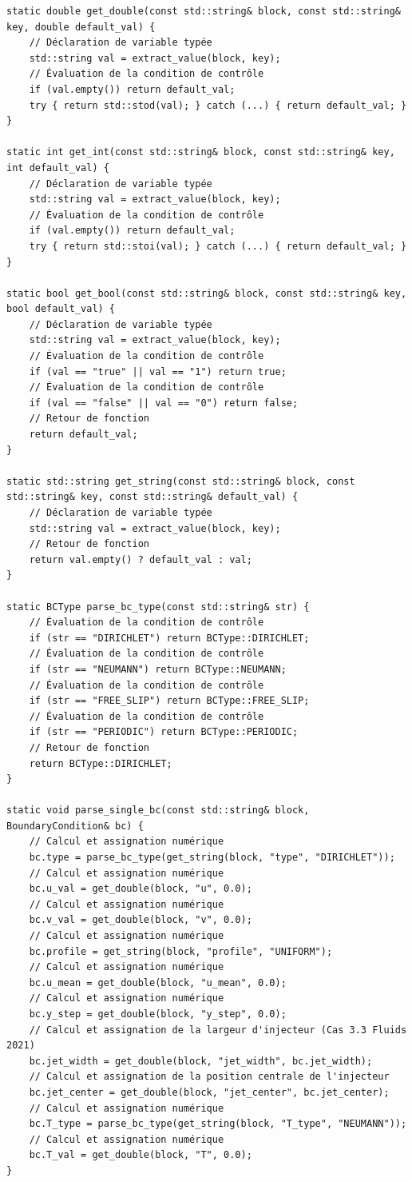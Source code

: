 \documentclass[10pt,a4paper,oneside]{book}
\begin{document}
\begin{lstlisting}[language={[11]C++}]
static double get_double(const std::string& block, const std::string& key, double default_val) {
    // Déclaration de variable typée
    std::string val = extract_value(block, key);
    // Évaluation de la condition de contrôle
    if (val.empty()) return default_val;
    try { return std::stod(val); } catch (...) { return default_val; }
}

static int get_int(const std::string& block, const std::string& key, int default_val) {
    // Déclaration de variable typée
    std::string val = extract_value(block, key);
    // Évaluation de la condition de contrôle
    if (val.empty()) return default_val;
    try { return std::stoi(val); } catch (...) { return default_val; }
}

static bool get_bool(const std::string& block, const std::string& key, bool default_val) {
    // Déclaration de variable typée
    std::string val = extract_value(block, key);
    // Évaluation de la condition de contrôle
    if (val == "true" || val == "1") return true;
    // Évaluation de la condition de contrôle
    if (val == "false" || val == "0") return false;
    // Retour de fonction
    return default_val;
}

static std::string get_string(const std::string& block, const std::string& key, const std::string& default_val) {
    // Déclaration de variable typée
    std::string val = extract_value(block, key);
    // Retour de fonction
    return val.empty() ? default_val : val;
}

static BCType parse_bc_type(const std::string& str) {
    // Évaluation de la condition de contrôle
    if (str == "DIRICHLET") return BCType::DIRICHLET;
    // Évaluation de la condition de contrôle
    if (str == "NEUMANN") return BCType::NEUMANN;
    // Évaluation de la condition de contrôle
    if (str == "FREE_SLIP") return BCType::FREE_SLIP;
    // Évaluation de la condition de contrôle
    if (str == "PERIODIC") return BCType::PERIODIC;
    // Retour de fonction
    return BCType::DIRICHLET;
}

static void parse_single_bc(const std::string& block, BoundaryCondition& bc) {
    // Calcul et assignation numérique
    bc.type = parse_bc_type(get_string(block, "type", "DIRICHLET"));
    // Calcul et assignation numérique
    bc.u_val = get_double(block, "u", 0.0);
    // Calcul et assignation numérique
    bc.v_val = get_double(block, "v", 0.0);
    // Calcul et assignation numérique
    bc.profile = get_string(block, "profile", "UNIFORM");
    // Calcul et assignation numérique
    bc.u_mean = get_double(block, "u_mean", 0.0);
    // Calcul et assignation numérique
    bc.y_step = get_double(block, "y_step", 0.0);
    // Calcul et assignation de la largeur d'injecteur (Cas 3.3 Fluids 2021)
    bc.jet_width = get_double(block, "jet_width", bc.jet_width);
    // Calcul et assignation de la position centrale de l'injecteur
    bc.jet_center = get_double(block, "jet_center", bc.jet_center);
    // Calcul et assignation numérique
    bc.T_type = parse_bc_type(get_string(block, "T_type", "NEUMANN"));
    // Calcul et assignation numérique
    bc.T_val = get_double(block, "T", 0.0);
}


\end{lstlisting}
\end{document}
